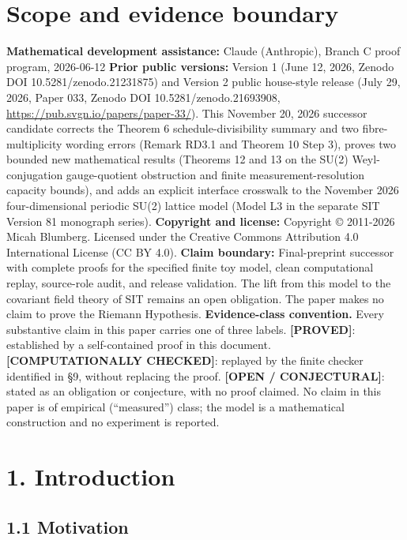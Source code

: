 \documentclass[
  american,
  11pt,
  letterpaper,
]{article}
\begin{document}
\section{Scope and evidence boundary}\label{scope-and-evidence-boundary}

\textbf{Mathematical development assistance:} Claude (Anthropic), Branch C proof program, 2026-06-12 \textbf{Prior public versions:} Version 1 (June 12, 2026, Zenodo DOI 10.5281/zenodo.21231875) and Version 2 public house-style release (July 29, 2026, Paper 033, Zenodo DOI 10.5281/zenodo.21693908, \url{https://pub.svgn.io/papers/paper-33/}). This November 20, 2026 successor candidate corrects the Theorem 6 schedule-divisibility summary and two fibre-multiplicity wording errors (Remark RD3.1 and Theorem 10 Step 3), proves two bounded new mathematical results (Theorems 12 and 13 on the SU(2) Weyl-conjugation gauge-quotient obstruction and finite measurement-resolution capacity bounds), and adds an explicit interface crosswalk to the November 2026 four-dimensional periodic SU(2) lattice model (Model L3 in the separate SIT Version 81 monograph series). \textbf{Copyright and license:} Copyright © 2011-2026 Micah Blumberg. Licensed under the Creative Commons Attribution 4.0 International License (CC BY 4.0). \textbf{Claim boundary:} Final-preprint successor with complete proofs for the specified finite toy model, clean computational replay, source-role audit, and release validation. The lift from this model to the covariant field theory of SIT remains an open obligation. The paper makes no claim to prove the Riemann Hypothesis. \textbf{Evidence-class convention.} Every substantive claim in this paper carries one of three labels. \textbf{{[}PROVED{]}}: established by a self-contained proof in this document. \textbf{{[}COMPUTATIONALLY CHECKED{]}}: replayed by the finite checker identified in §9, without replacing the proof. \textbf{{[}OPEN / CONJECTURAL{]}}: stated as an obligation or conjecture, with no proof claimed. No claim in this paper is of empirical (``measured'') class; the model is a mathematical construction and no experiment is reported.

\section{1. Introduction}\label{introduction}

\subsection{1.1 Motivation}\label{motivation}
\end{document}
